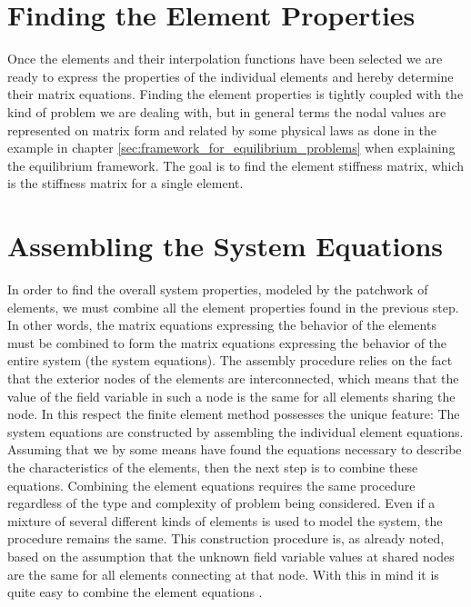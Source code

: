 \section{Finding the Element Properties}
\label{sec:finding-the-element-properties}
Once the elements and their interpolation functions have been
selected
we are ready to express the properties of the individual elements and
hereby determine their matrix equations.
Finding the element properties is tightly coupled with the kind of
problem we are dealing with, but in general terms the nodal values are
represented on matrix form and related by some physical laws as done in the
example in chapter \vref{sec:framework_for_equilibrium_problems} when
explaining the equilibrium
framework. The goal is to find the element stiffness matrix,
which is the stiffness matrix for a single element.
%

\section{Assembling the System  Equations}
\label{sec:asseble-the-element-properties}
In order to find the overall system properties, modeled by the
patchwork of elements, we must combine all the element properties
found in the previous step. In other words, the matrix equations
expressing the behavior of the elements must be combined to form the
matrix equations expressing the behavior of the entire system (the
system equations).
The assembly procedure relies on the fact that the exterior nodes
of the elements are interconnected, which means that the value of the
field variable in such a node is the same for all elements sharing the node. 
In this respect the finite element method possesses the unique feature:
The system equations are constructed by assembling the individual
element equations.
%
Assuming that we by some means have found the equations necessary to
describe the characteristics of the elements, then the next step
is to combine these equations. Combining the element equations
requires the same procedure regardless of the type
and complexity of problem being considered. Even if a mixture of
several different kinds of elements is used to model the system, the
procedure remains the same.
This construction procedure is, as already noted, based on the
assumption that the unknown field variable values at shared nodes are
the same for all elements connecting at that node. With this in mind
it is quite easy to combine the element equations
.


